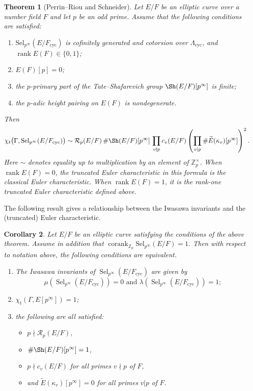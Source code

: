 \documentclass[12pt]{amsart}
\newtheorem{theorem}{Theorem}[section]
\newtheorem{corollary}[theorem]{Corollary}
\newcommand{\Z}{\mathbb{Z}}
\newcommand{\Sel}{\mathrm{Sel}}
\newcommand{\op}[1]{\operatorname{#1}}
\numberwithin{equation}{section}
\begin{document}
\begin{theorem}[Perrin--Riou and Schneider]\label{th ECF}
Let $E/F$ be an elliptic curve over a number field $F$ and let $p$ be an odd prime. Assume that the following conditions are satisfied:
\begin{enumerate}
    \item $\Sel_{p^\infty}(E/F_{\op{cyc}})$ is cofinitely generated and cotorsion over $\Lambda_{\op{cyc}}$, and $\operatorname{rank}E(F)\in\{0,1\}$;
    \item $E(F)[p]=0$;
    \item the $p$-primary part of the Tate--Shafarevich group $\Sh(E/F)[p^\infty]$ is finite;
    \item the $p$-adic height pairing on $E(F)$ is nondegenerate.
\end{enumerate}
Then
\[
\chi_t\bigl(\Gamma,\Sel_{p^\infty}(E/F_{\mathrm{cyc}})\bigr)
\sim
\mathcal{R}_p(E/F)\,
\#\Sh(E/F)[p^\infty]\,
\prod_{v\nmid p} c_v(E/F)
\left(
    \prod_{v\mid p}
    \#\widetilde{E}(\kappa_v)[p^\infty]
\right)^2.
\]
Here $\sim$ denotes equality up to multiplication by an element of $\mathbb{Z}_p^\times$. When $\operatorname{rank}E(F)=0$, the truncated Euler characteristic in this formula is the classical Euler characteristic. When $\operatorname{rank}E(F)=1$, it is the rank-one truncated Euler characteristic defined above.
\end{theorem}
 The following result gives a relationship between the Iwasawa invariants and the (truncated) Euler characteristic.
\begin{corollary}\label{cor ECF mulambda}
Let $E/F$ be an elliptic curve satisfying the conditions of the above theorem. Assume in addition that $\op{corank}_{\Z_p}\Sel_{p^\infty}(E/F)=1$. Then with respect to notation above, the following conditions are equivalent.
\begin{enumerate}
    \item The Iwasawa invariants of $\op{Sel}_{p^\infty}(E/F_{\op{cyc}})$ are given by \[\mu\left(\op{Sel}_{p^\infty}(E/F_{\op{cyc}})\right)=0\text{ and }\lambda\left(\op{Sel}_{p^\infty}(E/F_{\op{cyc}})\right)=1;\]
    \item $\chi_t(\Gamma, E[p^\infty])=1$;
    \item the following are all satisfied:
    \begin{itemize}
        \item $p\nmid \mathcal{R}_p(E/F)$,
        \item $\# \Sh(E/F)[p^\infty]=1$,
        \item $p\nmid c_v(E/F)$ for all primes $v\nmid p$ of $F$,
        \item and $\widetilde{E}(\kappa_v)[p^\infty]=0$ for all primes $v|p$ of $F$.
    \end{itemize}   
\end{enumerate}
\end{corollary}
\end{document}
